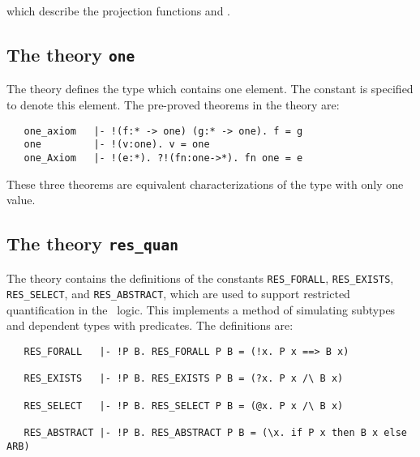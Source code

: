 \noindent which describe the projection functions  and .

\subsection{The theory {\tt one}}%
%
%

The theory  defines  the type   which  contains one element.
The constant    is specified  to denote  this element.   The pre-proved
theorems in the theory  are:

\begin{hol}
\begin{verbatim}
   one_axiom   |- !(f:* -> one) (g:* -> one). f = g
   one         |- !(v:one). v = one
   one_Axiom   |- !(e:*). ?!(fn:one->*). fn one = e
\end{verbatim}\end{hol}

\noindent These three theorems are equivalent characterizations of the type
with only one value.

\subsection{The theory {\tt res\_quan}}\label{res-quant}


The theory  contains the definitions of the constants
{\small\verb!RES_FORALL!}, {\small\verb!RES_EXISTS!},
{\small\verb!RES_SELECT!}, and {\small\verb!RES_ABSTRACT!},
which are used to support restricted
quantification in the \HOL\ logic.  This
implements a method of simulating subtypes and dependent types with
predicates. The definitions are:

\begin{hol}
\begin{verbatim}
   RES_FORALL   |- !P B. RES_FORALL P B = (!x. P x ==> B x)

   RES_EXISTS   |- !P B. RES_EXISTS P B = (?x. P x /\ B x)

   RES_SELECT   |- !P B. RES_SELECT P B = (@x. P x /\ B x)

   RES_ABSTRACT |- !P B. RES_ABSTRACT P B = (\x. if P x then B x else ARB)
\end{verbatim}\end{hol}


